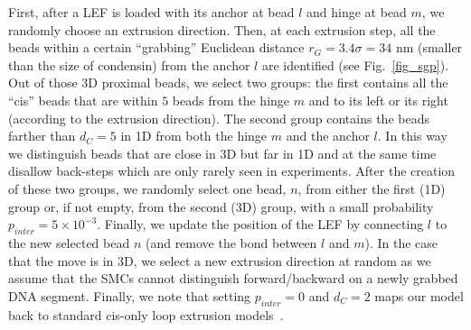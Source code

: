\documentclass[aps,prl,twocolumn,a4paper,10pt,notitlepage,footinbib,nobalancelastpage,superscriptaddress,showpacs,floatfix]{revtex4-1}%
\newcommand{\dmi}[1]{\textcolor{black}{#1}}%
\begin{document}
First, after a LEF is loaded with its anchor at bead $l$ and hinge at bead $m$, we randomly choose an extrusion direction. Then, at each extrusion step, all the beads within a certain ``grabbing'' Euclidean distance $r_G=3.4\sigma=34$ nm (smaller than the size of condensin) from the anchor $l$ are identified (see Fig.~\ref{fig_sgp}). Out of those 3D proximal beads, we select two groups: the first contains all the ``cis'' beads that are within $5$ beads from the hinge $m$ and to its left or its right (according to the extrusion direction).
The second group contains the beads farther than $d_C=5$ in 1D from both the hinge $m$ and the anchor $l$. In this way we distinguish beads that are close in 3D but far in 1D and at the same time disallow back-steps which are only rarely seen in experiments. 
After the creation of these two groups, we randomly select one bead, $n$, from either the first (1D) group or, if not empty, from the second (3D) group, with a small probability $p_{inter}=5\times 10^{-3}$. Finally, we update the position of the LEF by connecting $l$ to the new selected bead $n$ (and remove the bond between $l$ and $m$). In the case that the move is in 3D, we select a new extrusion direction at random as we assume that the SMCs cannot distinguish forward/backward on a newly grabbed DNA segment. Finally, we note that setting $p_{inter}=0$ and $d_C=2$ maps our model back to standard cis-only loop extrusion models~\cite{Fudenberg2016}.
\end{document}
